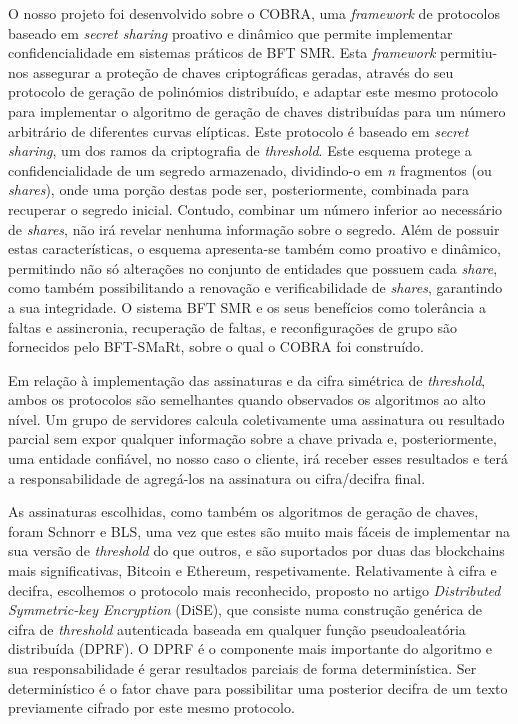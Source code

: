 O nosso projeto foi desenvolvido sobre o COBRA, uma \textit{framework} de protocolos  baseado em \textit{secret sharing} proativo e dinâmico que permite implementar confidencialidade em sistemas práticos de BFT SMR. Esta \textit{framework} permitiu-nos assegurar a proteção de chaves criptográficas geradas, através do seu protocolo de geração de polinómios distribuído, e adaptar este mesmo protocolo para implementar o algoritmo de geração de chaves distribuídas para um número arbitrário de diferentes curvas elípticas. Este protocolo é baseado em \textit{secret sharing}, um dos ramos da criptografia de \textit{threshold}. Este esquema protege a confidencialidade de um segredo armazenado, dividindo-o em \textit{n} fragmentos (ou \textit{shares}), onde uma porção destas pode ser, posteriormente, combinada para recuperar o segredo inicial. Contudo, combinar um número inferior ao necessário de \textit{shares}, não irá revelar nenhuma informação sobre o segredo. Além de possuir estas características, o esquema apresenta-se também como proativo e dinâmico, permitindo não só alterações no conjunto de entidades que possuem cada \textit{share}, como também possibilitando a renovação e verificabilidade de \textit{shares}, garantindo a sua integridade. O sistema BFT SMR e os seus benefícios como tolerância a faltas e assincronia, recuperação de faltas, e reconfigurações de grupo são fornecidos pelo BFT-SMaRt, sobre o qual o COBRA foi construído.

Em relação à implementação das assinaturas e da cifra simétrica de \textit{threshold}, ambos os protocolos são semelhantes quando observados os algoritmos ao alto nível. Um grupo de servidores calcula coletivamente uma assinatura ou resultado parcial sem expor qualquer informação sobre a chave privada e, posteriormente, uma entidade confiável, no nosso caso o cliente, irá receber esses resultados e terá a responsabilidade de agregá-los na assinatura ou cifra/decifra final.

As assinaturas escolhidas, como também os algoritmos de geração de chaves, foram Schnorr e BLS, uma vez que estes são muito mais fáceis de implementar na sua versão de \textit{threshold} do que outros, e são suportados por duas das blockchains mais significativas, Bitcoin e Ethereum, respetivamente. Relativamente à cifra e decifra, escolhemos o protocolo mais reconhecido, proposto no artigo \textit{Distributed Symmetric-key Encryption} (DiSE), que consiste numa construção genérica de cifra de \textit{threshold} autenticada baseada em qualquer função pseudoaleatória distribuída (DPRF). O DPRF é o componente mais importante do algoritmo e sua responsabilidade é gerar resultados parciais de forma determinística. Ser determinístico é o fator chave para possibilitar uma posterior decifra de um texto previamente cifrado por este mesmo protocolo.


